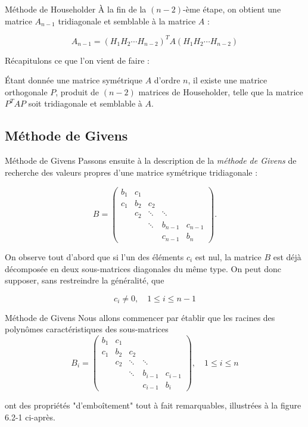 \documentclass[french, 10pt]{beamer}
\theoremstyle{definition}
\begin{document}
\begin{frame}{Méthode de Householder}
	À la fin de la $(n-2)$-ème étape, on obtient une matrice $A_{n-1}$ tridiagonale et semblable à la matrice $A$ :
	
	$$
	A_{n-1}=\left(H_1 H_2 \cdots H_{n-2}\right)^T A\left(H_1 H_2 \cdots H_{n-2}\right)
	$$
	
	
	Récapitulons ce que l'on vient de faire :\\
	\begin{theorem}
		Étant donnée une matrice symétrique $A$ d'ordre $n$, il existe une matrice orthogonale $P$, produit de $(n-2)$ matrices de Householder, telle que la matrice $P^T A P$ soit tridiagonale et semblable à $A$.
	\end{theorem}
	
	
\end{frame}
\subsection{Méthode de Givens}
\begin{frame}{Méthode de Givens}
	Passons ensuite à la description de la \textit{méthode de Givens} de recherche des valeurs propres d’une matrice symétrique tridiagonale :
	
	\[
	B =
	\begin{pmatrix}
		b_1 & c_1 & & & \\
		c_1 & b_2 & c_2 & & \\
		& c_2 & \ddots & \ddots & \\
		& & \ddots & b_{n-1} & c_{n-1} \\
		& & & c_{n-1} & b_n
	\end{pmatrix}.
	\]
	
	
	On observe tout d'abord que si l'un des éléments $c_i$ est nul, la matrice $B$ est déjà décomposée en deux sous-matrices diagonales du même type. On peut donc supposer, sans restreindre la généralité, que
	
	$$
	c_i \neq 0, \quad 1 \leqslant i \leqslant n-1
	$$
	
	
	
	
\end{frame}

\begin{frame}{Méthode de Givens}
	Nous allons commencer par établir que les racines des polynômes caractéristiques des sous-matrices
	$$
	B_i=\begin{pmatrix}
		b_1 & c_1 & & & \\
		c_1 & b_2 & c_2 & & \\
		& c_2 & \ddots & \ddots & \\
		& & \ddots & b_{i-1} & c_{i-1} \\
		& & & c_{i-1} & b_i
	\end{pmatrix}, \quad 1 \leqslant i \leqslant n
	$$
	
	ont des propriétés "d'emboîtement" tout à fait remarquables, illustrées à la figure 6.2-1 ci-après.
\end{frame}
\end{document}
